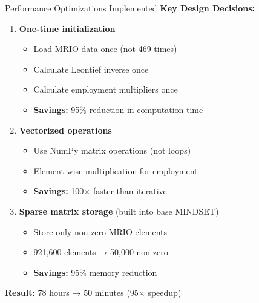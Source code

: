 \documentclass[10pt]{beamer}
\begin{document}

\begin{frame}{Performance Optimizations Implemented}
\textbf{Key Design Decisions:}

\vspace{0.3cm}

\begin{enumerate}
    \item \textbf{One-time initialization}
    \begin{itemize}
        \item Load MRIO data once (not 469 times)
        \item Calculate Leontief inverse once
        \item Calculate employment multipliers once
        \item \textbf{Savings:} 95\% reduction in computation time
    \end{itemize}

    \vspace{0.3cm}

    \item \textbf{Vectorized operations}
    \begin{itemize}
        \item Use NumPy matrix operations (not loops)
        \item Element-wise multiplication for employment
        \item \textbf{Savings:} 100$\times$ faster than iterative
    \end{itemize}

    \vspace{0.3cm}

    \item \textbf{Sparse matrix storage} (built into base MINDSET)
    \begin{itemize}
        \item Store only non-zero MRIO elements
        \item 921,600 elements → 50,000 non-zero
        \item \textbf{Savings:} 95\% memory reduction
    \end{itemize}
\end{enumerate}

\vspace{0.3cm}

\textbf{Result:} 78 hours → 50 minutes (95$\times$ speedup)

\end{frame}
\end{document}
